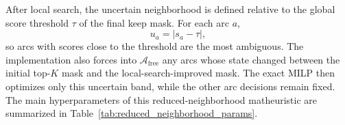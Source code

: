After local search, the uncertain neighborhood is defined relative to the global score threshold $\tau$ of the final keep mask. For each arc $a$,
\begin{equation}
    u_a = \left|s_a - \tau\right|,
    \label{eq:uncertainty_score}
\end{equation}
so arcs with scores close to the threshold are the most ambiguous. The implementation also forces into $\mathcal{A}_{\mathrm{free}}$ any arcs whose state changed between the initial top-$K$ mask and the local-search-improved mask. The exact MILP then optimizes only this uncertain band, while the other arc decisions remain fixed. The main hyperparameters of this reduced-neighborhood matheuristic are summarized in Table~\ref{tab:reduced_neighborhood_params}.



